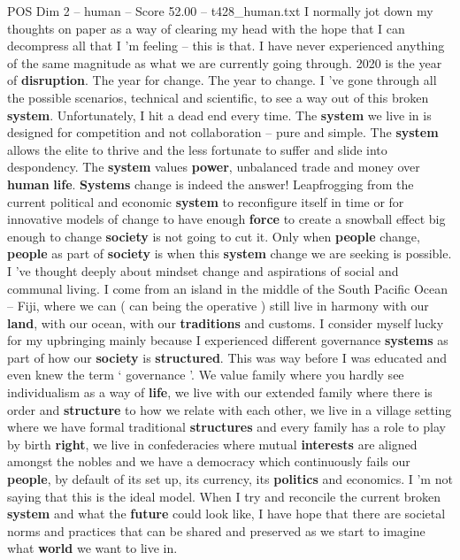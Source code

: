 \begin{textsample}{POS Dim 2 – human – Score 52.00 – t428\_human.txt}  \label{ex:f2_pos_026}
I normally jot down my thoughts on paper as a way of clearing my head with the hope that I can decompress all that I ’m feeling – this is that.
I have never experienced anything of the same magnitude as what we are currently going through. 2020 is the year of \textbf{disruption}.
The year for change.
The year to change.
I ’ve gone through all the possible scenarios, technical and scientific, to see a way out of this broken \textbf{system}.
Unfortunately, I hit a dead end every time.
The \textbf{system} we live in is designed for competition and not collaboration – pure and simple.
The \textbf{system} allows the elite to thrive and the less fortunate to suffer and slide into despondency.
The \textbf{system} values \textbf{power}, unbalanced trade and money over \textbf{human} \textbf{life}. \textbf{Systems} change is indeed the answer!
Leapfrogging from the current political and economic \textbf{system} to reconfigure itself in time or for innovative models of change to have enough \textbf{force} to create a snowball effect big enough to change \textbf{society} is not going to cut it.
Only when \textbf{people} change, \textbf{people} as part of \textbf{society} is when this \textbf{system} change we are seeking is possible.
I ’ve thought deeply about mindset change and aspirations of social and communal living.
I come from an island in the middle of the South Pacific Ocean – Fiji, where we can ( can being the operative ) still live in harmony with our \textbf{land}, with our ocean, with our \textbf{traditions} and customs.
I consider myself lucky for my upbringing mainly because I experienced different governance \textbf{systems} as part of how our \textbf{society} is \textbf{structured}.
This was way before I was educated and even knew the term ‘ governance ’.
We value family where you hardly see individualism as a way of \textbf{life}, we live with our extended family where there is order and \textbf{structure} to how we relate with each other, we live in a village setting where we have formal traditional \textbf{structures} and every family has a role to play by birth \textbf{right}, we live in confederacies where mutual \textbf{interests} are aligned amongst the nobles and we have a democracy which continuously fails our \textbf{people}, by default of its set up, its currency, its \textbf{politics} and economics.
I ’m not saying that this is the ideal model.
When I try and reconcile the current broken \textbf{system} and what the \textbf{future} could look like, I have hope that there are societal norms and practices that can be shared and preserved as we start to imagine what \textbf{world} we want to live in.

\end{textsample}
